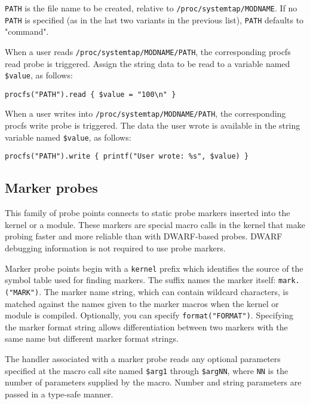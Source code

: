 \documentclass[twoside,english]{article}
\newenvironment{vindent}
{\begin{list}{}{\setlength{\listparindent}{6pt}}
\item[]}
{\end{list}}
\begin{document}
\texttt{PATH} is the file name to be created, relative to
\texttt{/proc/systemtap/MODNAME}.  If no \texttt{PATH} is specified
(as in the last two variants in the previous list), \texttt{PATH}
defaults to "command".

When a user reads \texttt{/proc/systemtap/MODNAME/PATH}, the
corresponding procfs read probe is triggered.  Assign the string data
to be read to a variable named \texttt{\$value}, as follows:
\begin{vindent}
\begin{verbatim}
procfs("PATH").read { $value = "100\n" }
\end{verbatim}
\end{vindent}

When a user writes into \texttt{/proc/systemtap/MODNAME/PATH}, the
corresponding procfs write probe is triggered.  The data the user
wrote is available in the string variable named \texttt{\$value}, as
follows:
\begin{vindent}
\begin{verbatim}
procfs("PATH").write { printf("User wrote: %s", $value) }
\end{verbatim}
\end{vindent}


\subsection{Marker probes}
This family of probe points connects to static probe markers inserted
into the kernel or a module. These markers are special macro calls in
the kernel that make probing faster and more reliable than with
DWARF-based probes.  DWARF debugging information is not required to
use probe markers.

Marker probe points begin with a \texttt{kernel} prefix which
identifies the source of the symbol table used for finding
markers. The suffix names the marker itself:
\texttt{mark.("MARK")}. The marker name string, which can contain
wildcard characters, is matched against the names given to the marker
macros when the kernel or module is compiled.  Optionally, you can
specify \texttt{format("FORMAT")}.  Specifying the marker format
string allows differentiation between two markers with the same name
but different marker format strings.

The handler associated with a marker probe reads any optional
parameters specified at the macro call site named \texttt{\$arg1}
through \texttt{\$argNN}, where \texttt{NN} is the number of
parameters supplied by the macro. Number and string parameters are
passed in a type-safe manner.
\end{document}
